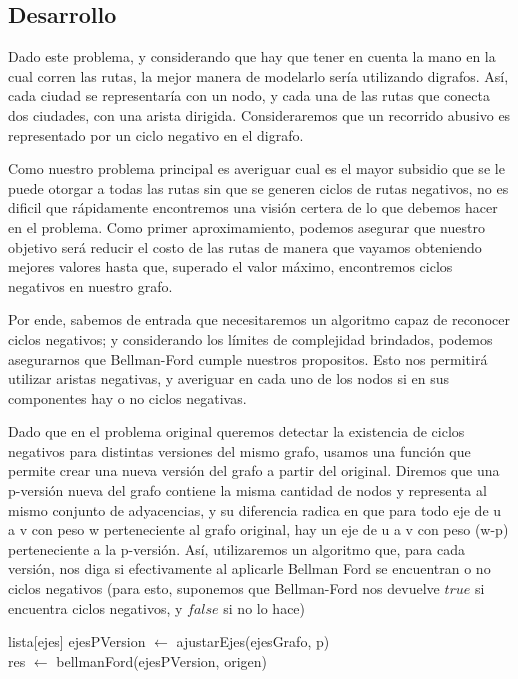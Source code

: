 \subsection{Desarrollo}
Dado este problema, y considerando que hay que tener en cuenta la mano en la cual corren las rutas, la mejor manera de modelarlo sería utilizando digrafos. Así, cada ciudad se representaría con un nodo, y cada una de las rutas que conecta dos ciudades, con una arista dirigida. Consideraremos que un recorrido abusivo es representado por un ciclo negativo en el digrafo.
\\
\par
Como nuestro problema principal es averiguar cual es el mayor subsidio que se le puede otorgar a todas las rutas sin que se generen ciclos de rutas negativos, no es dificil que rápidamente encontremos una visión certera de lo que debemos hacer en el problema. Como primer aproximamiento, podemos asegurar que nuestro objetivo será reducir el costo de las rutas de manera que vayamos obteniendo mejores valores hasta que, superado el valor máximo, encontremos ciclos negativos en nuestro grafo.
\\
\par
Por ende, sabemos de entrada que necesitaremos un algoritmo capaz de reconocer ciclos negativos; y considerando los límites de complejidad brindados, podemos asegurarnos que Bellman-Ford cumple nuestros propositos. Esto nos permitirá utilizar aristas negativas, y averiguar en cada uno de los nodos si en sus componentes hay o no ciclos negativas.
\\
\par
Dado que en el problema original queremos detectar la existencia de ciclos negativos para distintas versiones del mismo grafo, usamos una función que permite crear una nueva versión del grafo a partir del original. Diremos que una p-versión nueva del grafo contiene la misma cantidad de nodos y representa al mismo conjunto de adyacencias, y su diferencia radica en que para todo eje de u a v con peso w perteneciente al grafo original, hay un eje de u a v con peso (w-p) perteneciente a la p-versión. Así, utilizaremos un algoritmo que, para cada versión, nos diga si efectivamente al aplicarle Bellman Ford se encuentran o no ciclos negativos (para esto, suponemos que Bellman-Ford nos devuelve $true$ si encuentra ciclos negativos, y $false$ si no lo hace)
\\
\par
\begin{algorithm}[H]
		\NoCaptionOfAlgo
		\caption{}
		
		lista[ejes] ejesPVersion $\leftarrow$ ajustarEjes(ejesGrafo, p)\\
		res $\leftarrow$ bellmanFord(ejesPVersion, origen)\\

	\end{algorithm}


